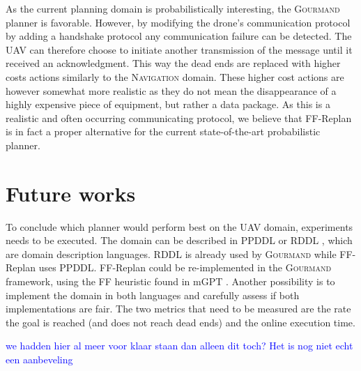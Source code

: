 \documentclass[runningheads,a4paper]{llncs}
\newcommand\todo[1]{\textcolor{blue}{#1}}
\begin{document}
As the current planning domain is probabilistically interesting, the
\textsc{Gourmand} planner is favorable. However, by modifying the drone's
communication protocol by adding a handshake protocol any communication failure
can be detected. The UAV can therefore choose to initiate another transmission
of the message until it received an acknowledgment. This way the dead ends are
replaced with higher costs actions similarly to the \textsc{Navigation} domain.
These higher cost actions are however somewhat more realistic as they do not
mean the disappearance of a highly expensive piece of equipment, but rather a
data package. As this is a realistic and often occurring communicating
protocol, we believe that FF-Replan is in fact a proper alternative for the
current state-of-the-art probabilistic planner.


\section{Future works}

To conclude which planner would perform best on the UAV domain, experiments
needs to be executed. The domain can be described in PPDDL
\cite{younes2004ppddl1} or RDDL \cite{Sanner:RDDL}, which are domain
description languages. RDDL is already used by \textsc{Gourmand} while
FF-Replan uses PPDDL\@. FF-Replan could be re-implemented in the
\textsc{Gourmand} framework, using the FF heuristic found in mGPT
\cite{bonet2011planning}. Another possibility is to implement the domain in
both languages and carefully assess if both implementations are fair.  The two
metrics that need to be measured are the rate the goal is reached (and does not
reach dead ends) and the online execution time.

\todo{we hadden hier al meer voor klaar staan dan alleen dit toch? Het is nog niet echt een aanbeveling}



\end{document}
